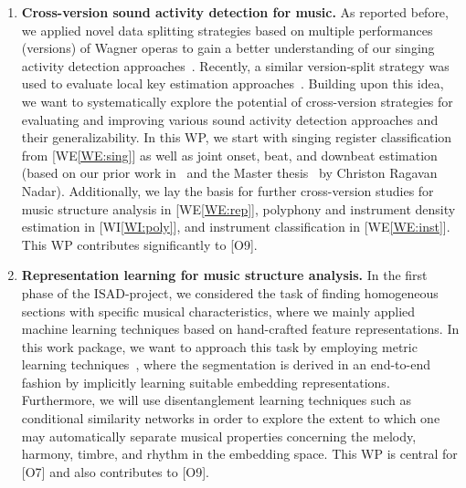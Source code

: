 \documentclass[11pt,a4paper]{article}
\def\PN{\mathrm{ISAD}}
\theoremstyle{plain} \newtheorem{define}{Definition}[section]
\begin{document}
{\begin{enumerate}[itemindent=0.5cm]
\item  \label{WE:cross}
\textbf{Cross-version sound activity detection for music.} 
%
As reported before, we applied novel data splitting strategies based on multiple performances (versions) of Wagner operas to gain a better understanding of our singing activity detection approaches~\cite{KrauseMW21_OperaSingingActivity_Electronics,MimilakisWAAM19_SingingVDetWagner_MML}. Recently, a similar version-split strategy was used to evaluate local key estimation approaches~\cite{WeissSM20_LocalKey_TASLP}. Building upon this idea, we want to systematically explore the potential of cross-version strategies for evaluating and improving various sound activity detection approaches and their generalizability. In this WP, we start with singing register classification from [WE\ref{WE:sing}] as well as joint onset, beat, and downbeat estimation (based on our prior work in~\cite[Chapter 6]{Mueller15_FMP_SPRINGER} and the Master thesis~\cite{Nadar20_MultitaskLearning_MasterThesis} by Christon Ragavan Nadar). Additionally, we lay the basis for further cross-version studies for music structure analysis in [WE\ref{WE:rep}], polyphony and instrument density estimation in [WI\ref{WI:poly}], and instrument classification in [WE\ref{WE:inst}].
%
This WP contributes significantly to [O9].

\item  \label{WE:rep}
\textbf{Representation learning for music structure analysis.} 
%
In the first phase of the $\PN$-project, we considered the task of finding homogeneous sections with specific musical characteristics, where we mainly applied machine learning techniques based on hand-crafted feature representations. In this work package, we want to approach this task by employing metric learning techniques~\cite{Schroff:2015:FaceNet:ARXIV}, where the segmentation is derived in an end-to-end fashion by implicitly learning suitable embedding representations. 
%
Furthermore, we will use disentanglement learning techniques such as conditional similarity networks \cite{Lee:2020:Disentangle:ISMIR} in order to explore the extent to which one may automatically separate musical properties concerning the melody, harmony, timbre, and rhythm in the embedding space. 
%
This WP is central for [O7] and also contributes to [O9].


\end{enumerate}}
\end{document}
